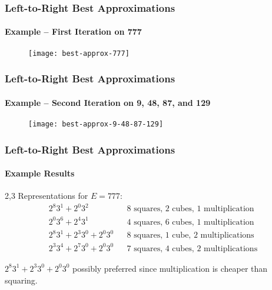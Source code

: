 \documentclass{beamer}
\begin{document}
\begin{frame}
\frametitle{Left-to-Right Best Approximations}
\framesubtitle{Example -- First Iteration on 777}
\begin{figure}
\texttt{[image: best-approx-777]}
\end{figure}
\end{frame}
\begin{frame}
\frametitle{Left-to-Right Best Approximations}
\framesubtitle{Example -- Second Iteration on 9, 48, 87, and 129}
\begin{figure}
\texttt{[image: best-approx-9-48-87-129]}
\end{figure}
\end{frame}
\begin{frame}
\frametitle{Left-to-Right Best Approximations}
\framesubtitle{Example Results}
2,3 Representations for $E=777$:
\begin{align*}
2^8 3^1 + 2^0 3^2 && \textrm{8 squares, 2 cubes, 1 multiplication} \\
2^0 3^6 + 2^4 3^1 && \textrm{4 squares, 6 cubes, 1 multiplication} \\
2^8 3^1 + 2^3 3^0 + 2^0 3^0 && \textrm{8 squares, 1 cube, 2 multiplications} \\
2^3 3^4 + 2^7 3^0 + 2^0 3^0 && \textrm{7 squares, 4 cubes, 2 multiplications}
\end{align*}

\bigskip
$2^8 3^1 + 2^3 3^0 + 2^0 3^0$ possibly preferred since multiplication is cheaper than squaring.
\end{frame}
\end{document}
